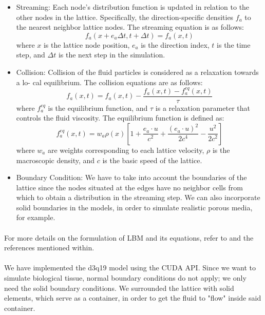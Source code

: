 \begin{itemize}
	\item Streaming: Each node's distribution function is updated in relation to the other nodes in the lattice. Specifically, the direction-specific densities $f_a$ to the nearest neighbor lattice nodes. The streaming equation is as follows:
	\begin{equation}
		f_a(x + e_a \Delta t, t + \Delta t) = f_a(x,t)
	\end{equation}
	where $x$ is the lattice node position, $e_a$ is the direction index, $t$ is the time step, and $\Delta t$ is the next step in the simulation.
	\item Collision: Collision of the fluid particles is considered as a relaxation towards a lo-
cal equilibrium. The collision equations are as follows:
	\begin{equation}
		f_a(x,t) = f_a(x,t) - \frac{f_a(x,t)-f_a^{eq}(x,t)}{\tau}
	\end{equation}
	where $f_a^{eq}$ is the equilibrium function, and $\tau$ is a relaxation parameter that controls the fluid viscosity. The equilibrium function is defined as:
	\begin{equation}
		f_a^{eq}(x,t) = w_a \rho(x)[1 + \frac{e_a \cdot u}{c^2} + \frac{(e_a \cdot u)^2}{2 c^4} - \frac{u^2}{2 c^2}]
	\end{equation}
	where $w_a$ are weights corresponding to each lattice velocity, $\rho$ is the macroscopic density, and $c$ is the basic speed of the lattice.
	\item Boundary Condition: We have to take into account the boundaries of the lattice since the nodes situated at the edges have no neighbor cells from which to obtain a distribution in the streaming step. We can also incorporate solid boundaries in the models, in order to simulate realistic porous media, for example.
\end{itemize} 

\paragraph{}For more details on the formulation of LBM and its equations, refer to \citep{sukop2006lattice, rinaldi2011modelos} and the references mentioned within.

\paragraph{}We have implemented the d3q19 model using the CUDA API. Since we want to simulate biological tissue, normal boundary conditions do not apply; we only need the solid boundary conditions. We surrounded the lattice with solid elements, which serve as a container, in order to get the fluid to "flow" inside said container. 

